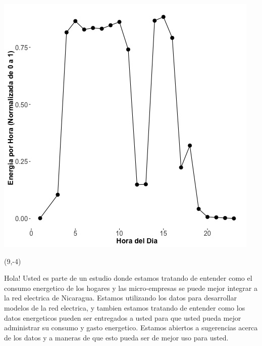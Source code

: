\documentclass{article}\usepackage[]{graphicx}\usepackage[]{color}
\newenvironment{knitrout}{}{} %
\begin{document}
\begin{knitrout}
\color{fgcolor}
\includegraphics[scale=0.75]{figure/A14_fplot_norm_median} 
\end{knitrout}

 \begin{textblock}{1}(9,-4)
\begin{minipage}{20em}
\begingroup

\endgroup
\end{minipage}
\end{textblock}



\vspace{70px}
\begin{knitrout}
Hola! Usted es parte de un estudio donde estamos tratando de entender como el consumo energetico de los hogares y las micro-empresas se puede mejor integrar a la red electrica de Nicaragua. Estamos utilizando los datos para desarrollar modelos de la red electrica, y tambien estamos tratando de entender como los datos energeticos pueden ser entregados a usted para que usted pueda mejor administrar su consumo y gasto energetico.  Estamos abiertos a sugerencias acerca de los datos y a maneras de que esto pueda ser de mejor uso para usted.
\end{knitrout}
\end{document}
